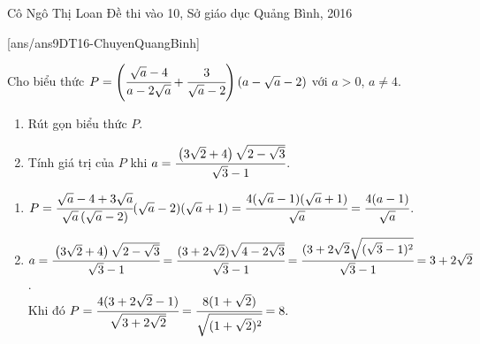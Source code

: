 \begin{name}
{Cô Ngô Thị Loan}
{Đề thi vào 10, Sở giáo dục Quảng Bình, 2016}
\end{name}
\setcounter{ex}{0}
[ans/ans9DT16-ChuyenQuangBinh]
\begin{ex}%
   Cho biểu thức $ P=\left( \cfrac{\sqrt{a}-4}{a-2\sqrt{a}}+\cfrac{3}{\sqrt{a}-2}\right)\left( a-\sqrt{a}-2\right) $ với $ a>0 $, $ a\ne 4 $.
    \begin{enumerate}
        \item Rút gọn biểu thức $ P $.
        \item Tính giá trị của $ P $ khi $ a=\cfrac{\left(3\sqrt{2}+4 \right)\sqrt{2-\sqrt{3}}}{\sqrt{3}-1} $.
    \end{enumerate}
\loigiai
    {
   \begin{enumerate}
   	\item $ P=\cfrac{\sqrt{a}-4+3\sqrt{a}}{\sqrt{a}\left(\sqrt{a}-2\right)}(\sqrt{a}-2)(\sqrt{a}+1)=\cfrac{4(\sqrt{a}-1)(\sqrt{a}+1)}{\sqrt{a}}=\cfrac{4(a-1)}{\sqrt{a}}$.
   	\item $ a=\cfrac{\left(3\sqrt{2}+4 \right)\sqrt{2-\sqrt{3}}}{\sqrt{3}-1} =\cfrac{(3+2\sqrt{2})\sqrt{4-2\sqrt{3}}}{\sqrt{3}-1}=\cfrac{(3+2\sqrt{2}\sqrt{(\sqrt{3}-1)^2}}{\sqrt{3}-1}=3+2\sqrt{2} $.
   	\\ Khi đó $ P=\cfrac{4(3+2\sqrt{2}-1)}{\sqrt{3+2\sqrt{2}}} =\cfrac{8(1+\sqrt{2})}{\sqrt{(1+\sqrt{2})^2}}=8.$
   \end{enumerate}
    }
\end{ex}


